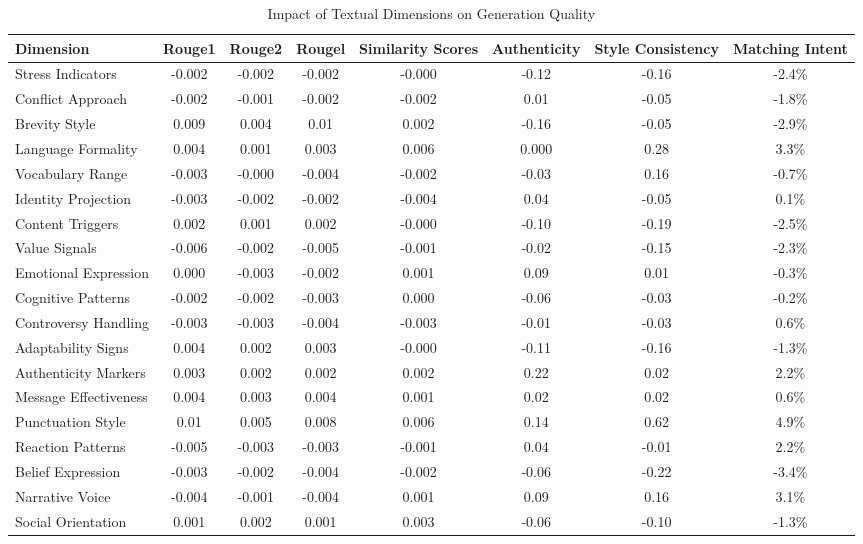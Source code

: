 \begin{table}
\caption{Impact of Textual Dimensions on Generation Quality}
\label{table1}
\begin{tabular}{lccccccc}
\hline
Dimension & Rouge1 & Rouge2 & Rougel & Similarity Scores & Authenticity & Style Consistency & Matching Intent \\
\hline
Stress Indicators & -0.002 & -0.002 & -0.002 & -0.000 & -0.12 & -0.16 & -2.4\% \\
Conflict Approach & -0.002 & -0.001 & -0.002 & -0.002 & 0.01 & -0.05 & -1.8\% \\
Brevity Style & 0.009 & 0.004 & 0.01 & 0.002 & -0.16 & -0.05 & -2.9\% \\
Language Formality & 0.004 & 0.001 & 0.003 & 0.006 & 0.000 & 0.28 & 3.3\% \\
Vocabulary Range & -0.003 & -0.000 & -0.004 & -0.002 & -0.03 & 0.16 & -0.7\% \\
Identity Projection & -0.003 & -0.002 & -0.002 & -0.004 & 0.04 & -0.05 & 0.1\% \\
Content Triggers & 0.002 & 0.001 & 0.002 & -0.000 & -0.10 & -0.19 & -2.5\% \\
Value Signals & -0.006 & -0.002 & -0.005 & -0.001 & -0.02 & -0.15 & -2.3\% \\
Emotional Expression & 0.000 & -0.003 & -0.002 & 0.001 & 0.09 & 0.01 & -0.3\% \\
Cognitive Patterns & -0.002 & -0.002 & -0.003 & 0.000 & -0.06 & -0.03 & -0.2\% \\
Controversy Handling & -0.003 & -0.003 & -0.004 & -0.003 & -0.01 & -0.03 & 0.6\% \\
Adaptability Signs & 0.004 & 0.002 & 0.003 & -0.000 & -0.11 & -0.16 & -1.3\% \\
Authenticity Markers & 0.003 & 0.002 & 0.002 & 0.002 & 0.22 & 0.02 & 2.2\% \\
Message Effectiveness & 0.004 & 0.003 & 0.004 & 0.001 & 0.02 & 0.02 & 0.6\% \\
Punctuation Style & 0.01 & 0.005 & 0.008 & 0.006 & 0.14 & 0.62 & 4.9\% \\
Reaction Patterns & -0.005 & -0.003 & -0.003 & -0.001 & 0.04 & -0.01 & 2.2\% \\
Belief Expression & -0.003 & -0.002 & -0.004 & -0.002 & -0.06 & -0.22 & -3.4\% \\
Narrative Voice & -0.004 & -0.001 & -0.004 & 0.001 & 0.09 & 0.16 & 3.1\% \\
Social Orientation & 0.001 & 0.002 & 0.001 & 0.003 & -0.06 & -0.10 & -1.3\% \\

\end{tabular}
\end{table}

